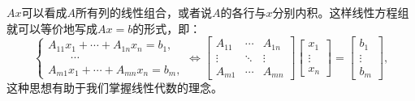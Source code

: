 \begin{remark}
	$Ax$可以看成$A$所有列的线性组合，或者说$A$的各行与$x$分别内积。这样线性方程组就可以等价地写成$Ax=b$的形式，即：
	\[
		\begin{cases}
	        A_{11}x_1+\cdots+A_{1n}x_n=b_1,\\
	        \qquad\cdots\\
	        A_{m1}x_1+\cdots+A_{mn}x_n=b_m,
	    \end{cases}\iff
	    \begin{bmatrix}
	        A_{11}&\cdots&A_{1n}\\
	        \vdots&\ddots&\vdots\\
	        A_{m1}&\cdots&A_{mn}
	    \end{bmatrix}
	    \begin{bmatrix}
	        x_1\\\vdots\\x_n
	    \end{bmatrix}=
	    \begin{bmatrix}
	        b_1\\\vdots\\b_m
	    \end{bmatrix},
	\]
	这种思想有助于我们掌握线性代数的理念。
\end{remark}

